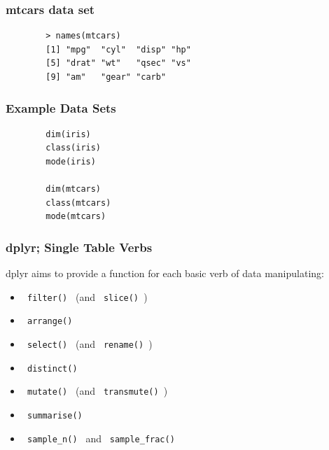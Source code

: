 \documentclass{beamer}
\begin{document}
	\begin{frame}[fragile]
		\frametitle{mtcars data set}
		\begin{verbatim}
		> names(mtcars)
		[1] "mpg"  "cyl"  "disp" "hp"  
		[5] "drat" "wt"   "qsec" "vs"  
		[9] "am"   "gear" "carb"
		\end{verbatim}
	\end{frame}
	\begin{frame}[fragile]
		\frametitle{Example Data Sets}
		\begin{verbatim}
		dim(iris)
		class(iris)
		mode(iris)
		
		dim(mtcars)
		class(mtcars)
		mode(mtcars)
		\end{verbatim}
	\end{frame}
	\begin{frame}
		\frametitle{dplyr; Single Table Verbs}
		dplyr aims to provide a function for each basic verb of data manipulating:
		\begin{itemize}
			\item \texttt{ filter() } (and \texttt{  slice() })
			\item \texttt{ arrange() }
			\item \texttt{ select() } (and \texttt{  rename() })
			\item \texttt{ distinct() }
			\item \texttt{ mutate() } (and \texttt{  transmute() })
			\item \texttt{ summarise() }
			\item \texttt{ sample\_n() } and \texttt{  sample\_frac() }
		\end{itemize}
	\end{frame}
	
\end{document}
